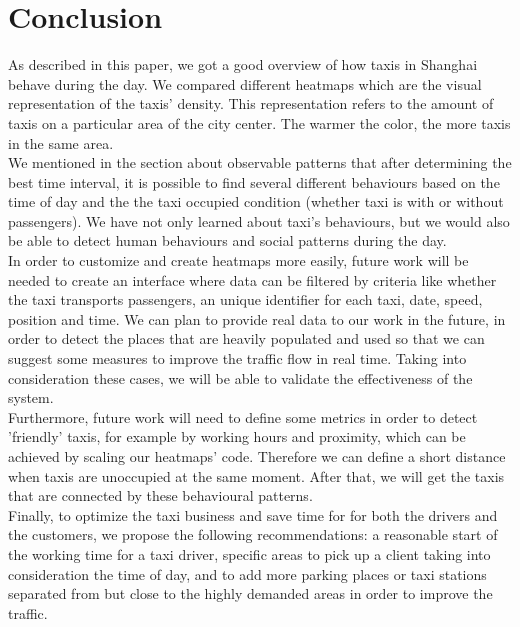 \documentclass[11pt,conference,a4paper,twocolumns,romanappendices]{IEEEtran}
\begin{document}
\section{Conclusion}
As described in this paper, we got a good overview of how taxis in Shanghai behave during the day. We compared different heatmaps which are the visual representation of the taxis' density. This representation refers to the amount of taxis on a particular area of the city center. The warmer the color, the more taxis in the same area. \\
We mentioned in the section about observable patterns that after determining the best time interval, it is possible to find several different behaviours based on the time of day and the the taxi occupied condition (whether taxi is with or without passengers). We have not only learned about taxi's behaviours, but we would also be able to detect human behaviours and social patterns during the day. \\
In order to customize and create heatmaps more easily, future work will be needed to create an interface where data can be filtered by criteria like whether the taxi transports passengers, an unique identifier for each taxi, date, speed, position and time. We can plan to provide real data to our work in the future, in order to detect the places that are heavily populated and used so that we can suggest some measures to improve the traffic flow in real time. Taking into consideration these cases, we will be able to validate the effectiveness of the system. \\
Furthermore, future work will need to define some metrics in order to detect 'friendly' taxis, for example by working hours and proximity, which can be achieved by scaling our heatmaps' code. Therefore we can define a short distance when taxis are unoccupied at the same moment. After that, we will get the taxis that are connected by these behavioural patterns. \\
Finally, to optimize the taxi business and save time for for both the drivers and the customers, we propose the following recommendations: a reasonable start of the working time for a taxi driver, specific areas to pick up a client taking into consideration the time of day, and to add more parking places or taxi stations separated from but close to the highly demanded areas in order to improve the traffic.

\newpage



\end{document}
